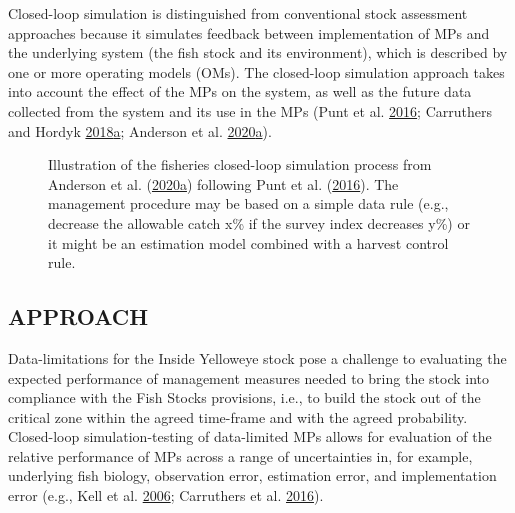\documentclass[11pt]{book}
\begin{document}
Closed-loop simulation is distinguished from conventional stock assessment approaches because it simulates feedback between implementation of MPs and the underlying system (the fish stock and its environment), which is described by one or more operating models (OMs). The closed-loop simulation approach takes into account the effect of the MPs on the system, as well as the future data collected from the system and its use in the MPs (Punt et al. \protect\hyperlink{ref-punt2016}{2016}; Carruthers and Hordyk \protect\hyperlink{ref-carruthers2018}{2018}\protect\hyperlink{ref-carruthers2018}{a}; Anderson et al. \protect\hyperlink{ref-anderson2020gfmp}{2020}\protect\hyperlink{ref-anderson2020gfmp}{a}).


\begin{figure}[htb]

{\centering {} 

}

\caption{Illustration of the fisheries closed-loop simulation process from Anderson et al. (\protect\hyperlink{ref-anderson2020gfmp}{2020}\protect\hyperlink{ref-anderson2020gfmp}{a}) following Punt et al. (\protect\hyperlink{ref-punt2016}{2016}). The management procedure may be based on a simple data rule (e.g., decrease the allowable catch x\% if the survey index decreases y\%) or it might be an estimation model combined with a harvest control rule.}\label{fig:mse-chart-basic}
\end{figure}
\hypertarget{sec:introduction-approach}{%
\subsection{APPROACH}\label{sec:introduction-approach}}

Data-limitations for the Inside Yelloweye stock pose a challenge to evaluating the expected performance of management measures needed to bring the stock into compliance with the Fish Stocks provisions, i.e., to build the stock out of the critical zone within the agreed time-frame and with the agreed probability. Closed-loop simulation-testing of data-limited MPs allows for evaluation of the relative performance of MPs across a range of uncertainties in, for example, underlying fish biology, observation error, estimation error, and implementation error (e.g., Kell et al. \protect\hyperlink{ref-kell2006}{2006}; Carruthers et al. \protect\hyperlink{ref-carruthers2016}{2016}).
\end{document}
